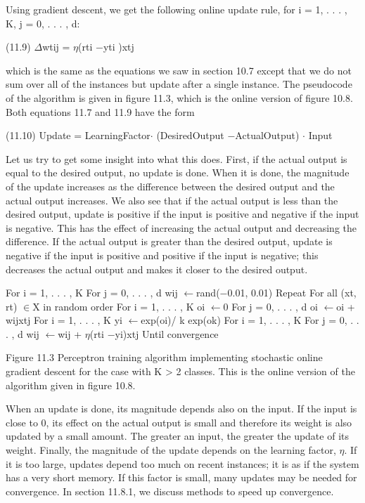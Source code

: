 Using gradient descent, we get the following online update rule, for i = 1, . . . , K, j = 0, . . . , d:

(11.9) $\Delta$wtij = $\eta$(rti $-$yti )xtj

which is the same as the equations we saw in section 10.7 except that we do not sum over all of the instances but update after a single instance. The pseudocode of the algorithm is given in figure 11.3, which is the online version of figure 10.8. Both equations 11.7 and 11.9 have the form

(11.10) Update = LearningFactor$\cdot$ (DesiredOutput $-$ActualOutput) $\cdot$ Input

Let us try to get some insight into what this does. First, if the actual output is equal to the desired output, no update is done. When it is done, the magnitude of the update increases as the difference between the desired output and the actual output increases. We also see that if the actual output is less than the desired output, update is positive if the input is positive and negative if the input is negative. This has the effect of increasing the actual output and decreasing the difference. If the actual output is greater than the desired output, update is negative if the input is positive and positive if the input is negative; this decreases the actual output and makes it closer to the desired output.

For i = 1, . . . , K For j = 0, . . . , d wij $\leftarrow$rand($-$0.01, 0.01) Repeat For all (xt, rt) $\in$X in random order For i = 1, . . . , K oi $\leftarrow$0 For j = 0, . . . , d oi $\leftarrow$oi + wijxtj For i = 1, . . . , K yi $\leftarrow$exp(oi)/ k exp(ok) For i = 1, . . . , K For j = 0, . . . , d wij $\leftarrow$wij + $\eta$(rti $-$yi)xtj Until convergence

Figure 11.3 Perceptron training algorithm implementing stochastic online gradient descent for the case with K > 2 classes. This is the online version of the algorithm given in figure 10.8.

When an update is done, its magnitude depends also on the input. If the input is close to 0, its effect on the actual output is small and therefore its weight is also updated by a small amount. The greater an input, the greater the update of its weight. Finally, the magnitude of the update depends on the learning factor, $\eta$. If it is too large, updates depend too much on recent instances; it is as if the system has a very short memory. If this factor is small, many updates may be needed for convergence. In section 11.8.1, we discuss methods to speed up convergence.

